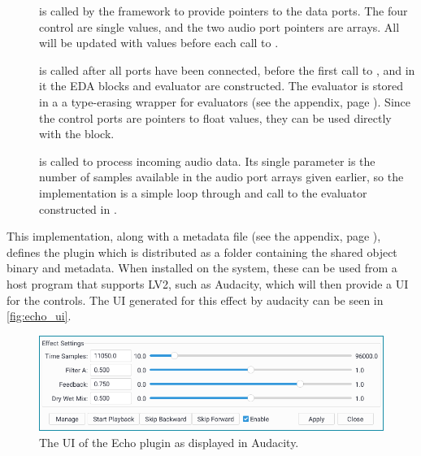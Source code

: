 \begin{description}
  \item [] is called by the framework to provide pointers to the data ports. The four control
        are single values, and the two audio port pointers are arrays. All will be updated with values before each
        call to .
  \item [] is called after all ports have been connected, before the first call to , and in it
        the EDA blocks and evaluator are constructed. The evaluator is stored in a  a
        type-erasing wrapper for evaluators (see the appendix, page \pageref{code:dyn_eval}). Since the control ports
        are pointers to float values, they can be used directly with the  block.
  \item [] is called to process incoming audio data. Its single parameter  is the number of
        samples available in the audio port arrays given earlier, so the implementation is a simple loop through and
        call to the evaluator constructed in .
\end{description}

This implementation, along with a metadata file (see the appendix, page \pageref{codefile:example/echo/metadata.ttl}), defines the
plugin which is distributed as a folder containing the shared object binary and metadata. When installed on
the system, these can be used from a host program that supports LV2, such as Audacity, which will then
provide a UI for the controls. The UI generated for this effect by audacity can be seen in
\autoref{fig:echo_ui}.

\begin{figure}
  \centering
  \includegraphics[width=\linewidth]{Pictures/echo_ui}
  \caption{The UI of the Echo plugin as displayed in Audacity.}
  \label{fig:echo_ui}
\end{figure}

